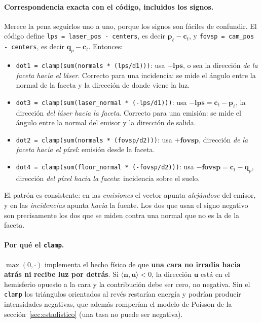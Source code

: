 \documentclass[11pt,a4paper]{article}
\newcommand{\vect}[1]{\boldsymbol{#1}}
\newcommand{\code}[1]{\texttt{#1}}
\theoremstyle{definition}
\theoremstyle{plain}
\begin{document}
\paragraph{Correspondencia exacta con el código, incluidos los signos.}
Merece la pena seguirlos uno a uno, porque los signos son fáciles de confundir.
El código define \code{lps = laser\_pos - centers}, es decir
$\vect p_\ell-\vect c_t$, y \code{fovsp = cam\_pos - centers}, es decir
$\vect q_p-\vect c_t$. Entonces:
%
\begin{itemize}[leftmargin=*]
  \item \code{dot1 = clamp(sum(normals * (lps/d1)))}: usa
        $+\vect{\text{lps}}$, o sea la dirección \emph{de la faceta hacia el
        láser}. Correcto para una incidencia: se mide el ángulo entre la normal
        de la faceta y la dirección de donde viene la luz.
  \item \code{dot3 = clamp(sum(laser\_normal * (-lps/d1)))}: usa
        $-\vect{\text{lps}} = \vect c_t-\vect p_\ell$, la dirección
        \emph{del láser hacia la faceta}. Correcto para una emisión: se mide el
        ángulo entre la normal del emisor y la dirección de salida.
  \item \code{dot2 = clamp(sum(normals * (fovsp/d2)))}: usa
        $+\vect{\text{fovsp}}$, dirección \emph{de la faceta hacia el píxel}:
        emisión desde la faceta.
  \item \code{dot4 = clamp(sum(floor\_normal * (-fovsp/d2)))}: usa
        $-\vect{\text{fovsp}} = \vect c_t - \vect q_p$, dirección \emph{del
        píxel hacia la faceta}: incidencia sobre el suelo.
\end{itemize}
%
El patrón es consistente: en las \emph{emisiones} el vector apunta
\emph{alejándose} del emisor, y en las \emph{incidencias} apunta \emph{hacia} la
fuente. Los dos que usan el signo negativo son precisamente los dos que se
miden contra una normal que no es la de la faceta.

\paragraph{Por qué el \code{clamp}.}
$\max(0,\cdot)$ implementa el hecho físico de que \textbf{una cara no irradia
hacia atrás ni recibe luz por detrás}. Si $\langle\vect n,\vect u\rangle<0$, la
dirección $\vect u$ está en el hemisferio opuesto a la cara y la contribución
debe ser cero, no negativa. Sin el \code{clamp} los triángulos orientados al
revés restarían energía y podrían producir intensidades negativas, que además
romperían el modelo de Poisson de la sección~\ref{sec:estadistico} (una tasa no
puede ser negativa).
\end{document}
